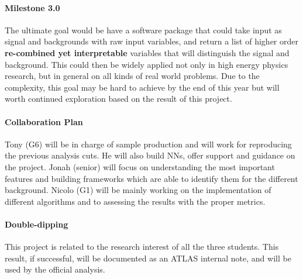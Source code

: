 \documentclass[11pt]{article}
\begin{document}
\paragraph{Milestone 3.0}
The ultimate goal would be have a software package that could take input as signal and backgrounds with raw input variables, and return a list of higher order \textbf{re-combined yet interpretable} variables that will distinguish the signal and background. This could then be widely applied not only in high energy physics research, but in general on all kinds of real world problems. Due to the complexity, this goal may be hard to achieve by the end of this year but will worth continued exploration based on the result of this project.

\paragraph{Collaboration Plan}
Tony (G6) will be in charge of sample production and will work for reproducing the previous analysis cuts. He will also build NNs, offer support and guidance on the project. 
Jonah (senior) will focus on understanding the most important features and building frameworks which are able to identify them for the different background.
Nicolo (G1) will be mainly working on the implementation of different algorithms and to assessing the results with the proper metrics.

\paragraph{Double-dipping}
This project is related to the research interest of all the three students. This result, if successful, will be documented as an ATLAS internal note, and will be used by the official analysis.
\end{document}
